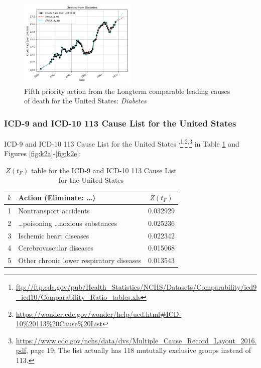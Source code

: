 \documentclass[10pt, a4paper, twocolumn]{IEEEconf}
\begin{document}
\begin{figure}[H]
  \centering
  \includegraphics[width=0.5\textwidth]{results/US_ICD_LONGTERM_COMPARABLE_LEADING/Diabetes_ets.png}
  \caption{Fifth priority action from the Longterm comparable leading causes of death for the United States: \textit{Diabetes}}\label{fig:k1e}
\end{figure}

\clearpage

\subsubsection{ICD-9 and ICD-10 113 Cause List for the United States}

ICD-9 and ICD-10 113 Cause List for the United States \citep{nbermortality,anderson2001comparability,icdcomparabilityratios,centers2017underlying}\textsuperscript{,}\footnote{\scriptsize{\url{ftp://ftp.cdc.gov/pub/Health_Statistics/NCHS/Datasets/Comparability/icd9_icd10/Comparability_Ratio_tables.xls}}}\textsuperscript{,}\footnote{\scriptsize{\url{https://wonder.cdc.gov/wonder/help/ucd.html\#ICD-10\%20113\%20Cause\%20List}}}\textsuperscript{,}\footnote{\scriptsize{\url{https://www.cdc.gov/nchs/data/dvs/Multiple_Cause_Record_Layout_2016.pdf}, page 19; The list actually has 118 mututally exclusive groups instead of 113.}} in Table \ref{table:ztable2} and Figures \ref{fig:k2a}-\ref{fig:k2e}:

\begin{table}[H]
  \centering
  \begin{tabular}{clc}
    \toprule
      $k$ & Action (Eliminate: \ldots) & $Z(t_F)$ \\
    \midrule
      1 &                      Nontransport accidents & 0.032929 \\
      2 &  \ldots poisoning \ldots noxious substances & 0.025236 \\
      3 &                     Ischemic heart diseases & 0.022342 \\
      4 &                    Cerebrovascular diseases & 0.015068 \\
      5 &    Other chronic lower respiratory diseases & 0.013543 \\
  \end{tabular}
  \caption{$Z(t_F)$ table for the ICD-9 and ICD-10 113 Cause List for the United States}
  \label{table:ztable2}
\end{table}
\end{document}

